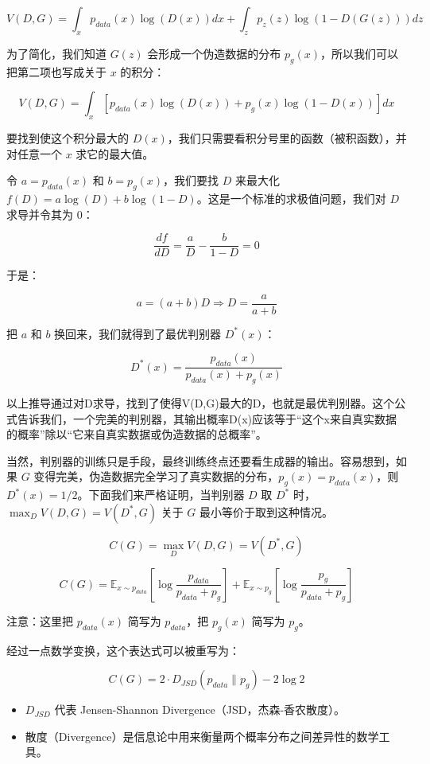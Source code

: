 \[
V(D,G)=\int_x p_{data}(x)\log(D(x))dx+\int_z p_z(z)\log(1-D(G(z)))dz
\]

为了简化，我们知道 \(G(z)\) 会形成一个伪造数据的分布 \(p_g(x)\)，所以我们可以把第二项也写成关于 \(x\) 的积分：

\[
V(D,G)=\int_x [p_{data}(x)\log(D(x))+p_g(x)\log(1-D(x))]dx
\]

要找到使这个积分最大的 \(D(x)\)，我们只需要看积分号里的函数（被积函数），并对任意一个 \(x\) 求它的最大值。

令 \(a=p_{data}(x)\) 和 \(b=p_g(x)\)，我们要找 \(D\) 来最大化 \(f(D)=a\log(D)+b\log(1-D)\)。这是一个标准的求极值问题，我们对 \(D\) 求导并令其为 0：

\[
\frac{df}{dD}=\frac{a}{D}-\frac{b}{1-D}=0
\]

于是：

\[
a=(a+b)D \Rightarrow D=\frac{a}{a+b}
\]

把 \(a\) 和 \(b\) 换回来，我们就得到了最优判别器 \(D^*(x)\)：

\[
D^*(x)=\frac{p_{data}(x)}{p_{data}(x)+p_g(x)}
\]

以上推导通过对D求导，找到了使得V(D,G)最大的D，也就是最优判别器。这个公式告诉我们，一个完美的判别器，其输出概率D(x)应该等于``这个x来自真实数据的概率''除以``它来自真实数据或伪造数据的总概率''。

当然，判别器的训练只是手段，最终训练终点还要看生成器的输出。容易想到，如果 \(G\) 变得完美，伪造数据完全学习了真实数据的分布，\(p_g(x)=p_{data}(x)\)，则 \(D^*(x)=1/2\)。下面我们来严格证明，当判别器 \(D\) 取 \(D^*\) 时，\(\max_D V(D,G)=V(D^*,G)\) 关于 \(G\) 最小等价于取到这种情况。

\[
C(G)=\max_D V(D,G)=V(D^*,G)
\]

\[
C(G)=\mathbb{E}_{x\sim p_{data}}\left[\log\frac{p_{data}}{p_{data}+p_g}\right]
+\mathbb{E}_{x\sim p_g}\left[\log\frac{p_g}{p_{data}+p_g}\right]
\]

注意：这里把 \(p_{data}(x)\) 简写为 \(p_{data}\)，把 \(p_g(x)\) 简写为 \(p_g\)。

经过一点数学变换，这个表达式可以被重写为：

\[
C(G)=2\cdot D_{JSD}(p_{data}\parallel p_g)-2\log 2
\]

\begin{itemize}
\tightlist
\item
  \(D_{JSD}\) 代表 Jensen-Shannon Divergence（JSD，杰森-香农散度）。
\item
  散度（Divergence）是信息论中用来衡量两个概率分布之间差异性的数学工具。
\end{itemize}

